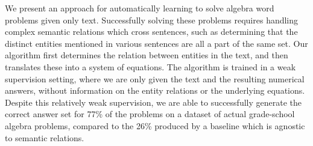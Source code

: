 We present an approach for automatically learning to solve algebra word problems given only text.  Successfully solving these problems requires handling complex semantic relations which cross sentences, such as determining that the distinct entities mentioned in various sentences are all a part of the same set.  Our algorithm first determines the relation between entities in the text, and then translates these into a system of equations.  The algorithm is trained in a weak supervision setting, where we are only given the text and the resulting numerical answers, without information on the entity relations or the underlying equations.  Despite this relatively weak supervision, we are able to successfully generate the correct answer set for 77\% of the problems on a dataset of actual grade-school algebra problems, compared to the 26\% produced by a baseline which is agnostic to semantic relations.
